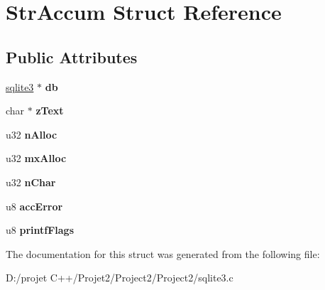 \hypertarget{struct_str_accum}{}\section{Str\+Accum Struct Reference}
\label{struct_str_accum}
\subsection*{Public Attributes}
\begin{DoxyCompactItemize}
\item 
\mbox{\label{struct_str_accum_ade44091c9a91671c9457b9e4a98a9a5d}} 
\mbox{\hyperlink{structsqlite3}{sqlite3}} $\ast$ {\bfseries db}
\item 
\mbox{\label{struct_str_accum_ac45a51cb7b85da2ae9865eac21d416dc}} 
char $\ast$ {\bfseries z\+Text}
\item 
\mbox{\label{struct_str_accum_a48d37540058f35811bd37c5ee56e0c93}} 
u32 {\bfseries n\+Alloc}
\item 
\mbox{\label{struct_str_accum_a113c466027421582120b873ba342529c}} 
u32 {\bfseries mx\+Alloc}
\item 
\mbox{\label{struct_str_accum_a9ae2f859cd15934c7fd1ed2243782607}} 
u32 {\bfseries n\+Char}
\item 
\mbox{\label{struct_str_accum_a0ff9aa2eca1d5dc78692721e2a56dc1e}} 
u8 {\bfseries acc\+Error}
\item 
\mbox{\label{struct_str_accum_a95038abba91f6ec1a74c9dfc4fec0df9}} 
u8 {\bfseries printf\+Flags}
\end{DoxyCompactItemize}


The documentation for this struct was generated from the following file\+:\begin{DoxyCompactItemize}
\item 
D\+:/projet C++/\+Projet2/\+Project2/\+Project2/sqlite3.\+c\end{DoxyCompactItemize}
